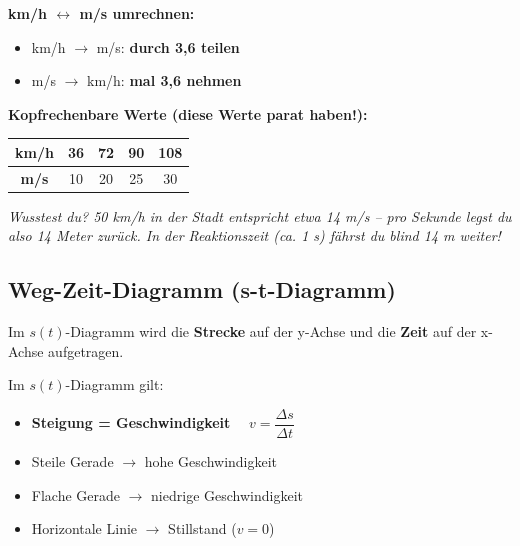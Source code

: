 \documentclass[11pt,a4paper]{article}
\begin{document}
\begin{tipp}
\textbf{km/h $\leftrightarrow$ m/s umrechnen:}
\begin{itemize}
\item km/h $\rightarrow$ m/s: \textbf{durch 3,6 teilen}
\item m/s $\rightarrow$ km/h: \textbf{mal 3,6 nehmen}
\end{itemize}

\vspace{0.3cm}
\textbf{Kopfrechenbare Werte (diese Werte parat haben!):}
\begin{center}
\begin{tabular}{|c|c|c|c|c|}
\hline
\rowcolor{lightblue}
\textbf{km/h} & 36 & 72 & 90 & 108 \\
\hline
\textbf{m/s} & 10 & 20 & 25 & 30 \\
\hline
\end{tabular}
\end{center}

\textit{Wusstest du? 50 km/h in der Stadt entspricht etwa 14 m/s -- pro Sekunde legst du also 14 Meter zurück. In der Reaktionszeit (ca. 1 s) fährst du blind 14 m weiter!}
\end{tipp}

\subsection{Weg-Zeit-Diagramm (s-t-Diagramm)}

Im $s(t)$-Diagramm wird die \textbf{Strecke} auf der y-Achse und die \textbf{Zeit} auf der x-Achse aufgetragen.

\begin{center}
\end{center}

\begin{merksatz}
Im $s(t)$-Diagramm gilt:
\begin{itemize}
\item \textbf{Steigung = Geschwindigkeit} $\quad v = \dfrac{\Delta s}{\Delta t}$
\item Steile Gerade $\rightarrow$ hohe Geschwindigkeit
\item Flache Gerade $\rightarrow$ niedrige Geschwindigkeit
\item Horizontale Linie $\rightarrow$ Stillstand ($v = 0$)
\end{itemize}
\end{merksatz}
\end{document}
